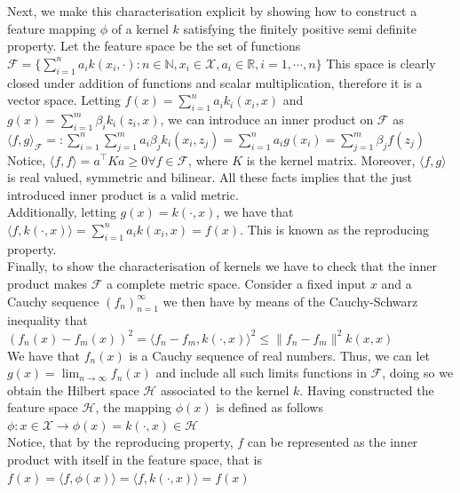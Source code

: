 Next, we make this characterisation explicit by showing how to construct a feature mapping $\phi$ of a kernel $k$ satisfying the finitely positive semi definite property.
Let the feature space be the set of functions 
\\
$\mathcal{F} =\{ \sum\limits_{i=1}^n a_i k(x_i, \cdot): n \in \mathbb{N}, x_i \in \mathcal{X}, a_i \in \mathbb{R}, i=1,\cdots, n\}$
This space is clearly closed under addition of functions and scalar multiplication, therefore it is a vector space.
Letting $f(x)=\sum\limits_{i=1}^n a_i k_i(x_i,x)$ and $g(x)=\sum\limits_{i=1}^m \beta_i k_i(z_i,x)$,  we can introduce an inner product on $\mathcal{F}$ as 
\\
$\langle f,g \rangle_{\mathcal{F}}=:\sum\limits_{i=1}^n\sum\limits_{j=1}^m a_i \beta_j k_i(x_i,z_j)=\sum\limits_{i=1}^n a_i g(x_i)= \sum\limits_{j=1}^m \beta_j f(z_j)$
\\
Notice, $\langle f, f \rangle= a^\intercal K a \geq 0 \forall f \in \mathcal{F}$, where $K$ is the kernel matrix.
Moreover, $\langle f, g \rangle$ is real valued, symmetric and bilinear. All these facts implies that the just introduced inner product is a valid metric.
\\
Additionally, letting $g(x)=k(\cdot, x)$, we have that $\langle f, k(\cdot, x)\rangle=\sum\limits_{i=1}^n a_i k(x_i,x)=f(x)$. This is known as the reproducing property.
\\
Finally, to show the characterisation of kernels we have to check that the inner product makes $\mathcal{F}$ a complete metric space.
Consider a fixed input $x$ and a Cauchy sequence $(f_n)_{n=1}^{\infty}$ we then have by means of the Cauchy-Schwarz inequality that 
\\
$(f_n(x)- f_m(x))^2=\langle f_n-f_m, k(\cdot, x)\rangle^2 \leq \| f_n - f_m \|^2 k(x,x)$
\\
We have that $f_n(x)$ is a Cauchy sequence of real numbers. Thus, we can let $g(x)=\lim_{n\to \infty} f_n(x)$ and include all such limits functions in $\mathcal{F}$, doing so we obtain the Hilbert space $\mathcal{H}$ associated to the kernel $k$.
Having constructed the feature space $\mathcal{H}$, the mapping $\phi(x)$ is defined as follows
\\
$\phi: x \in \mathcal{X} \to \phi(x)=k(\cdot, x) \in \mathcal{H}$
\\
Notice, that by the reproducing property, $f$ can be represented as the inner product with itself in the feature space, that is $f(x)=\langle f, \phi(x)\rangle=\langle f, k(\cdot, x)\rangle=f(x)$

